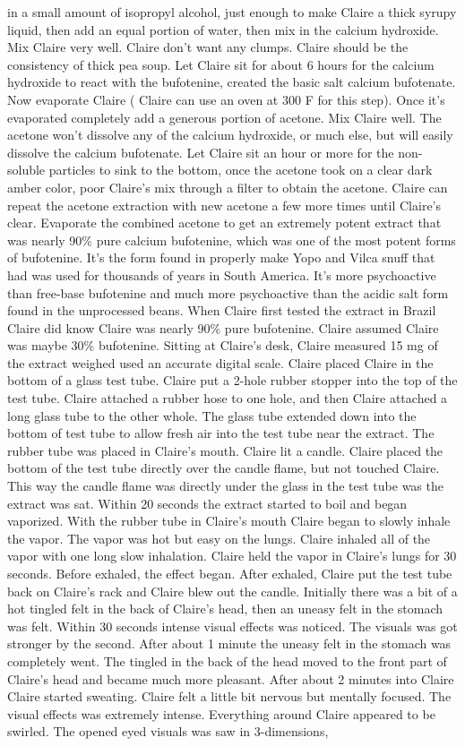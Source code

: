 \documentclass[12pt]{book}
\begin{document}
in a small amount of isopropyl alcohol, just enough to make Claire a thick syrupy liquid, then add an equal portion of water, then mix in the calcium hydroxide. Mix Claire very well. Claire don't want any clumps. Claire should be the consistency of thick pea soup. Let Claire sit for about 6 hours for the calcium hydroxide to react with the bufotenine, created the basic salt calcium bufotenate. Now evaporate Claire ( Claire can use an oven at 300 F for this step). Once it's evaporated completely add a generous portion of acetone. Mix Claire well. The acetone won't dissolve any of the calcium hydroxide, or much else, but will easily dissolve the calcium bufotenate. Let Claire sit an hour or more for the non-soluble particles to sink to the bottom, once the acetone took on a clear dark amber color, poor Claire's mix through a filter to obtain the acetone. Claire can repeat the acetone extraction with new acetone a few more times until Claire's clear. Evaporate the combined acetone to get an extremely potent extract that was nearly 90\% pure calcium bufotenine, which was one of the most potent forms of bufotenine. It's the form found in properly make Yopo and Vilca snuff that had was used for thousands of years in South America. It's more psychoactive than free-base bufotenine and much more psychoactive than the acidic salt form found in the unprocessed beans. When Claire first tested the extract in Brazil Claire did know Claire was nearly 90\% pure bufotenine. Claire assumed Claire was maybe 30\% bufotenine. Sitting at Claire's desk, Claire measured 15 mg of the extract weighed used an accurate digital scale. Claire placed Claire in the bottom of a glass test tube. Claire put a 2-hole rubber stopper into the top of the test tube. Claire attached a rubber hose to one hole, and then Claire attached a long glass tube to the other whole. The glass tube extended down into the bottom of test tube to allow fresh air into the test tube near the extract. The rubber tube was placed in Claire's mouth. Claire lit a candle. Claire placed the bottom of the test tube directly over the candle flame, but not touched Claire. This way the candle flame was directly under the glass in the test tube was the extract was sat. Within 20 seconds the extract started to boil and began vaporized. With the rubber tube in Claire's mouth Claire began to slowly inhale the vapor. The vapor was hot but easy on the lungs. Claire inhaled all of the vapor with one long slow inhalation. Claire held the vapor in Claire's lungs for 30 seconds. Before exhaled, the effect began. After exhaled, Claire put the test tube back on Claire's rack and Claire blew out the candle. Initially there was a bit of a hot tingled felt in the back of Claire's head, then an uneasy felt in the stomach was felt. Within 30 seconds intense visual effects was noticed. The visuals was got stronger by the second. After about 1 minute the uneasy felt in the stomach was completely went. The tingled in the back of the head moved to the front part of Claire's head and became much more pleasant. After about 2 minutes into Claire Claire started sweating. Claire felt a little bit nervous but mentally focused. The visual effects was extremely intense. Everything around Claire appeared to be swirled. The opened eyed visuals was saw in 3-dimensions, 
\end{document}
